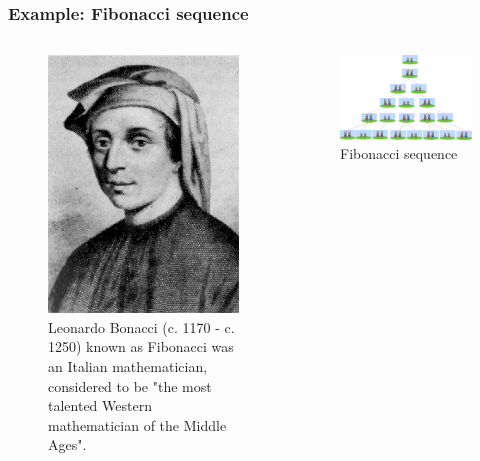 \begin{frame}
\frametitle{Example: Fibonacci sequence}
\begin{columns}
	\begin{column}{0.35\linewidth}
		
\begin{figure}
\centering
\includegraphics[height=0.5\textheight]{Images/discrete_time_systems_7}
\caption{\tiny{Leonardo Bonacci (c. 1170 - c. 1250) known as Fibonacci was an Italian mathematician, considered to be "the most talented Western mathematician of the Middle Ages".}}

\end{figure}
	\end{column}
	\begin{column}{0.65\linewidth}
\begin{figure}
\centering
\includegraphics[width=0.9\linewidth]{Images/discrete_time_systems_8}
\caption{Fibonacci sequence}
\end{figure}
	\end{column}
\end{columns}
\end{frame}
